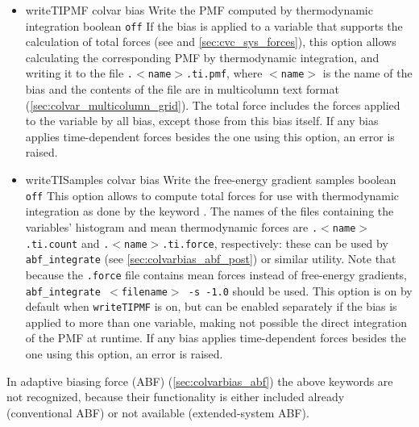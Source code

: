 \begin{itemize}

\item %
  \keydef
    {writeTIPMF}{%
    colvar bias}{%
    Write the PMF computed by thermodynamic integration}{%
    boolean}{%
    \texttt{off}}{%
    If the bias is applied to a variable that supports the calculation of total forces (see  and \ref{sec:cvc_sys_forces}), this option allows calculating the corresponding PMF by thermodynamic integration, and writing it to the file \outputName{}\texttt{.$<$name$>$.ti.pmf}, where \texttt{$<$name$>$} is the name of the bias and the contents of the file are in multicolumn text format (\ref{sec:colvar_multicolumn_grid}).
    The total force includes the forces applied to the variable by all bias, except those from this bias itself.
    If any bias applies time-dependent forces besides the one using this option, an error is raised.
}


\item %
  \keydef
    {writeTISamples}{%
    colvar bias}{%
    Write the free-energy gradient samples}{%
    boolean}{%
    \texttt{off}}{%
    This option allows to compute total forces for use with thermodynamic integration as done by the keyword .
    The names of the files containing the variables' histogram and mean thermodynamic forces are \outputName\texttt{.$<$name$>$.ti.count} and \outputName\texttt{.$<$name$>$.ti.force}, respectively: these can be used by \texttt{abf\_integrate} (see \ref{sec:colvarbias_abf_post}) or similar utility.
    Note that because the \texttt{.force} file contains mean forces instead of free-energy gradients, \texttt{abf\_integrate $<$filename$>$ -s -1.0} should be used.
    This option is on by default when \texttt{writeTIPMF} is on, but can be enabled separately if the bias is applied to more than one variable, making not possible the direct integration of the PMF at runtime.
    If any bias applies time-dependent forces besides the one using this option, an error is raised.
}

\end{itemize}

In adaptive biasing force (ABF) (\ref{sec:colvarbias_abf}) the above keywords are not recognized, because their functionality is either included already (conventional ABF) or not available (extended-system ABF).



